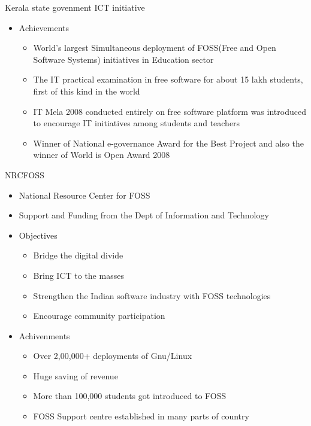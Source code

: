 \documentclass{beamer}
\begin{document}
    \begin{frame}{Kerala state govenment ICT initiative}
      \begin{itemize}
           \item Achievements
                \begin{itemize}
                     \item World’s largest Simultaneous deployment of FOSS(Free and Open Software Systems) initiatives in Education sector
                      \item The IT practical examination in free software for about 15 lakh students, first of this kind in the world
                       \item IT Mela 2008 conducted entirely on free software platform was introduced to encourage IT initiatives among students and teachers
                        \item Winner of National e-governance Award for the Best Project and also the winner of World is Open Award 2008
                 \end{itemize}
             
               
           \end{itemize}
     \end{frame}
\begin{frame}{NRCFOSS}
        \begin{itemize}
          \item National Resource Center for FOSS
          \item Support and Funding from the Dept of Information and Technology
          \item Objectives
              \begin{itemize}
                  \item Bridge the digital divide
                   \item Bring ICT to the masses
                    \item Strengthen the Indian software industry with FOSS technologies
                     \item Encourage community participation                   
               \end{itemize}
           \item Achivenments
               \begin{itemize}
                     \item Over 2,00,000+ deployments of Gnu/Linux
                      \item Huge saving of revenue
                       \item More than 100,000 students got introduced to FOSS
                        \item FOSS Support centre established in many parts of country 
                \end{itemize}
                   
        \end{itemize}
\end{frame}
\end{document}
